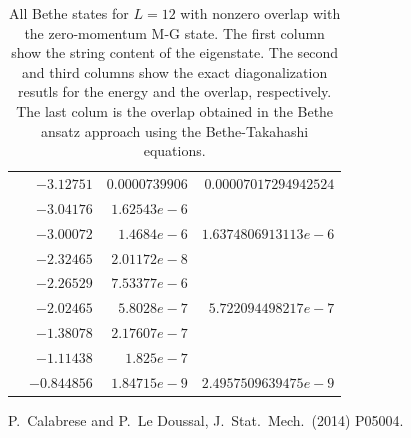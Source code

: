 \documentclass[11pt]{iopart}
\begin{document}
\begin{table}[h]
\begin{tabular}{rrrr}
& $-3.12751$ & $0.0000739906$     & $0.00007017294942524$\\
& $-3.04176$ & $1.62543e-6$       &\\
& $-3.00072$ & $1.4684e-6$        & $1.6374806913113e-6$\\
& $-2.32465$ & $2.01172e-8$       &\\
& $-2.26529$ & $7.53377e-6$       &\\
& $-2.02465$ & $5.8028e-7$        & $5.722094498217e-7$\\
& $-1.38078$ & $2.17607e-7$       &\\
& $-1.11438$ & $1.825e-7$         &\\
& $-0.844856$& $1.84715e-9$       & $2.4957509639475e-9$\\
\bottomrule
\end{tabular}
\caption{All Bethe states for $L=12$ with nonzero overlap with the zero-momentum 
 M-G state. The first column show the string content of the eigenstate. The second 
 and third columns show the exact diagonalization resutls for the energy and the 
 overlap, respectively. The last colum is the overlap obtained in the Bethe ansatz 
 approach using the Bethe-Takahashi equations.
}
\label{table:RV:sumruleN12}
\end{table}




\begin{thebibliography}{99}

P.~Calabrese and P.~Le Doussal, J.\ Stat.\ Mech.\ (2014) P05004. 

\end{thebibliography}
\end{document}
